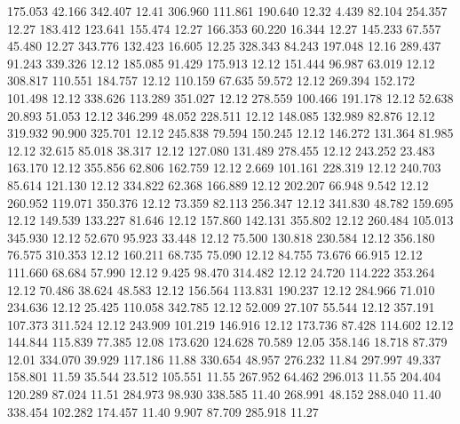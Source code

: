  175.053   42.166  342.407        12.41
 306.960  111.861  190.640        12.32
   4.439   82.104  254.357        12.27
 183.412  123.641  155.474        12.27
 166.353   60.220   16.344        12.27
 145.233   67.557   45.480        12.27
 343.776  132.423   16.605        12.25
 328.343   84.243  197.048        12.16
 289.437   91.243  339.326        12.12
 185.085   91.429  175.913        12.12
 151.444   96.987   63.019        12.12
 308.817  110.551  184.757        12.12
 110.159   67.635   59.572        12.12
 269.394  152.172  101.498        12.12
 338.626  113.289  351.027        12.12
 278.559  100.466  191.178        12.12
  52.638   20.893   51.053        12.12
 346.299   48.052  228.511        12.12
 148.085  132.989   82.876        12.12
 319.932   90.900  325.701        12.12
 245.838   79.594  150.245        12.12
 146.272  131.364   81.985        12.12
  32.615   85.018   38.317        12.12
 127.080  131.489  278.455        12.12
 243.252   23.483  163.170        12.12
 355.856   62.806  162.759        12.12
   2.669  101.161  228.319        12.12
 240.703   85.614  121.130        12.12
 334.822   62.368  166.889        12.12
 202.207   66.948    9.542        12.12
 260.952  119.071  350.376        12.12
  73.359   82.113  256.347        12.12
 341.830   48.782  159.695        12.12
 149.539  133.227   81.646        12.12
 157.860  142.131  355.802        12.12
 260.484  105.013  345.930        12.12
  52.670   95.923   33.448        12.12
  75.500  130.818  230.584        12.12
 356.180   76.575  310.353        12.12
 160.211   68.735   75.090        12.12
  84.755   73.676   66.915        12.12
 111.660   68.684   57.990        12.12
   9.425   98.470  314.482        12.12
  24.720  114.222  353.264        12.12
  70.486   38.624   48.583        12.12
 156.564  113.831  190.237        12.12
 284.966   71.010  234.636        12.12
  25.425  110.058  342.785        12.12
  52.009   27.107   55.544        12.12
 357.191  107.373  311.524        12.12
 243.909  101.219  146.916        12.12
 173.736   87.428  114.602        12.12
 144.844  115.839   77.385        12.08
 173.620  124.628   70.589        12.05
 358.146   18.718   87.379        12.01
 334.070   39.929  117.186        11.88
 330.654   48.957  276.232        11.84
 297.997   49.337  158.801        11.59
  35.544   23.512  105.551        11.55
 267.952   64.462  296.013        11.55
 204.404  120.289   87.024        11.51
 284.973   98.930  338.585        11.40
 268.991   48.152  288.040        11.40
 338.454  102.282  174.457        11.40
   9.907   87.709  285.918        11.27
